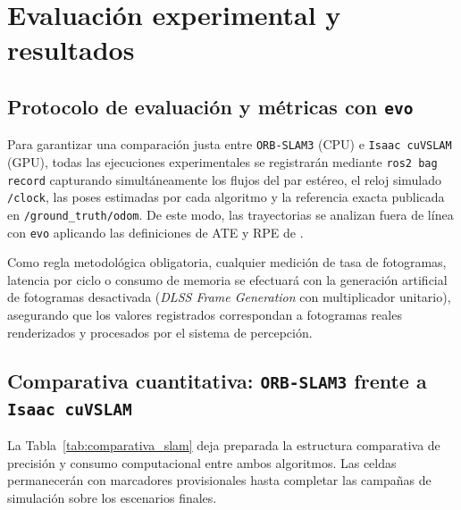 \chapter{Evaluación experimental y resultados}
\label{sec:evaluacion}

\section{Protocolo de evaluación y métricas con \texttt{evo}}
\label{sec:protocolo_evaluacion}

Para garantizar una comparación justa entre \texttt{ORB-SLAM3} (CPU) e \texttt{Isaac cuVSLAM} (GPU), todas las ejecuciones experimentales se registrarán mediante \texttt{ros2 bag record} capturando simultáneamente los flujos del par estéreo, el reloj simulado \texttt{/clock}, las poses estimadas por cada algoritmo y la referencia exacta publicada en \texttt{/ground\_truth/odom}. De este modo, las trayectorias se analizan fuera de línea con \texttt{evo} \parencite{grupp2017evo} aplicando las definiciones de ATE y RPE de \textcite{sturm2012benchmark}.

Como regla metodológica obligatoria, cualquier medición de tasa de fotogramas, latencia por ciclo o consumo de memoria se efectuará con la generación artificial de fotogramas desactivada (\textit{DLSS Frame Generation} con multiplicador unitario), asegurando que los valores registrados correspondan a fotogramas reales renderizados y procesados por el sistema de percepción.


\section{Comparativa cuantitativa: \texttt{ORB-SLAM3} frente a \texttt{Isaac cuVSLAM}}
\label{sec:comparativa_slam}

La Tabla~\ref{tab:comparativa_slam} deja preparada la estructura comparativa de precisión y consumo computacional entre ambos algoritmos. Las celdas permanecerán con marcadores provisionales hasta completar las campañas de simulación sobre los escenarios finales.


